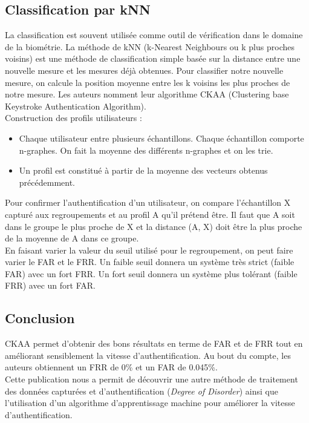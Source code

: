 \subsection{Classification par kNN}

La classification est souvent utilisée comme outil de vérification dans le domaine de la biométrie. La méthode de kNN (k-Nearest Neighbours ou k plus proches voisins) est une méthode de classification simple basée sur la distance entre une nouvelle mesure et les mesures déjà obtenues. Pour classifier notre nouvelle mesure, on calcule la position moyenne entre les k voisins les plus proches de notre mesure. Les auteurs nomment leur algorithme CKAA (Clustering base Keystroke Authentication Algorithm).\\

Construction des profils utilisateurs :\\

\begin{itemize}
  \item Chaque utilisateur entre plusieurs échantillons. Chaque échantillon comporte n-graphes. On fait la moyenne des différents n-graphes et on les trie.
  \item Un profil est constitué à partir de la moyenne des vecteurs obtenus précédemment.\\
\end{itemize}

Pour confirmer l'authentification d'un utilisateur, on compare l'échantillon X capturé aux regroupements et au profil A qu'il prétend être. Il faut que A soit dans le groupe le plus proche de X et la distance (A, X) doit être la plus proche de la moyenne de A dans ce groupe.\\

En faisant varier la valeur du seuil utilisé pour le regroupement, on peut faire varier le FAR et le FRR. Un faible seuil donnera un système très strict (faible FAR) avec un fort FRR. Un fort seuil donnera un système plus tolérant (faible FRR) avec un fort FAR.

\subsection{Conclusion}

CKAA permet d'obtenir des bons résultats en terme de FAR et de FRR tout en améliorant sensiblement la vitesse d'authentification. Au bout du compte, les auteurs obtiennent un FRR de 0\% et un FAR de 0.045\%.\\

Cette publication nous a permit de découvrir une autre méthode de traitement des données capturées et d'authentification (\textit{Degree of Disorder}) ainsi que l'utilisation d'un algorithme d'apprentissage machine pour améliorer la vitesse d'authentification.
